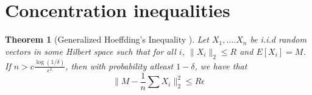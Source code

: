\documentclass[11pt]{article}
\newtheorem{theorem}{Theorem}
\begin{document}
\appendix
\section{Concentration inequalities}
\label{section:conIneq}

\begin{theorem}[Generalized Hoeffding's Inequality \cite{ashtiani2015dimension}]
Let $X_1, \ldots. X_n$ be i.i.d random vectors in some Hilbert space such that for all $i$, $\|X_i\|_2 \le R$ and $E[X_i] = M$. If $n > c\frac{\log(1/\delta)}{\epsilon^2}$, then with probability atleast $1-\delta$, we have that
$$\Big\|M - \frac{1}{n}\sum X_i\Big\|_2^2 \le R\epsilon$$ 
\end{theorem}
\end{document}
